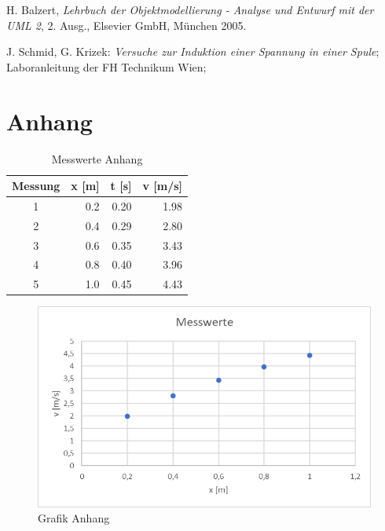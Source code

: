 \documentclass[10pt,a4paper]{article}
\begin{document}

\newpage

\begin{thebibliography}{-----}

H. Balzert, \textit{Lehrbuch der Objektmodellierung - Analyse und Entwurf mit der UML 2}, 2. Ausg., Elsevier GmbH, München 2005.

 J. Schmid, G. Krizek: \textit{Versuche zur Induktion einer Spannung in einer Spule}; Laboranleitung der FH Technikum Wien;

\end{thebibliography}


\newpage

\appendix

\section{Anhang}

\begin{table}[H]
\center
\begin{tabular}{crrr}
\toprule
Messung & x [m] & t [s] & v [m/s] \\
\midrule
1 & 0.2 & 0.20 & 1.98 \\
2 & 0.4 & 0.29 & 2.80 \\
3 & 0.6 & 0.35 & 3.43 \\
4 & 0.8 & 0.40 & 3.96 \\
5 & 1.0 & 0.45 & 4.43 \\
\bottomrule
\end{tabular}
\caption{Messwerte Anhang}
\label{tabelleanhang}
\end{table}

\begin{figure}[H]
\centering
    \includegraphics[scale=2]{bilder/Messwerte.png}
  \caption{Grafik Anhang}
  \label{grafikanhang}
\end{figure}

\end{document}
